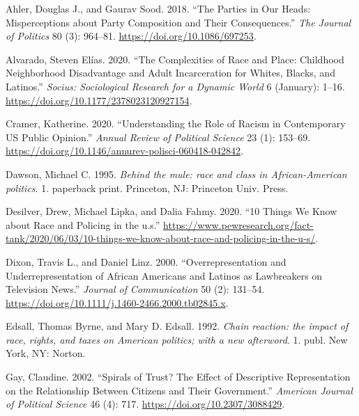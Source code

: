 \documentclass[
  12pt,
]{article}
\newlength{\cslhangindent}
\newlength{\cslentryspacingunit} %
\newenvironment{CSLReferences}[2] %
 {%
  \setlength{\parindent}{0pt}
  \ifodd #1
  \let\oldpar\par
  \def\par{\hangindent=\cslhangindent\oldpar}
  \fi
  \setlength{\parskip}{#2\cslentryspacingunit}
 }%
 {}
\begin{document}
\hypertarget{refs}{}
\begin{CSLReferences}{1}{0}
\leavevmode{}%
Ahler, Douglas J., and Gaurav Sood. 2018. {``The Parties in Our Heads:
Misperceptions about Party Composition and Their Consequences.''}
\emph{The Journal of Politics} 80 (3): 964--81.
\url{https://doi.org/10.1086/697253}.

\leavevmode{}%
Alvarado, Steven Elías. 2020. {``The Complexities of Race and Place:
Childhood Neighborhood Disadvantage and Adult Incarceration for Whites,
Blacks, and Latinos.''} \emph{Socius: Sociological Research for a
Dynamic World} 6 (January): 1--16.
\url{https://doi.org/10.1177/2378023120927154}.

\leavevmode{}%
Cramer, Katherine. 2020. {``Understanding the Role of Racism in
Contemporary US Public Opinion.''} \emph{Annual Review of Political
Science} 23 (1): 153--69.
\url{https://doi.org/10.1146/annurev-polisci-060418-042842}.

\leavevmode{}%
Dawson, Michael C. 1995. \emph{Behind the mule: race and class in
African-American politics}. 1. paperback print. Princeton, NJ: Princeton
Univ. Press.

\leavevmode{}%
Desilver, Drew, Michael Lipka, and Dalia Fahmy. 2020. {``10 Things We
Know about Race and Policing in the u.s.''}
\url{https://www.pewresearch.org/fact-tank/2020/06/03/10-things-we-know-about-race-and-policing-in-the-u-s/}.

\leavevmode{}%
Dixon, Travis L., and Daniel Linz. 2000. {``Overrepresentation and
Underrepresentation of African Americans and Latinos as Lawbreakers on
Television News.''} \emph{Journal of Communication} 50 (2): 131--54.
\url{https://doi.org/10.1111/j.1460-2466.2000.tb02845.x}.

\leavevmode{}%
Edsall, Thomas Byrne, and Mary D. Edsall. 1992. \emph{Chain reaction:
the impact of race, rights, and taxes on American politics; with a new
afterword}. 1. publ. New York, NY: Norton.

\leavevmode{}%
Gay, Claudine. 2002. {``Spirals of Trust? The Effect of Descriptive
Representation on the Relationship Between Citizens and Their
Government.''} \emph{American Journal of Political Science} 46 (4): 717.
\url{https://doi.org/10.2307/3088429}.


\end{CSLReferences}
\end{document}

